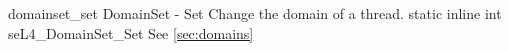 %
%
%
%

\apidoc
{domainset_set}
{DomainSet - Set}
{Change the domain of a thread.}
{static inline int seL4\_DomainSet\_Set}
{
}
{\errorenumdesc}
{See \autoref{sec:domains}}
